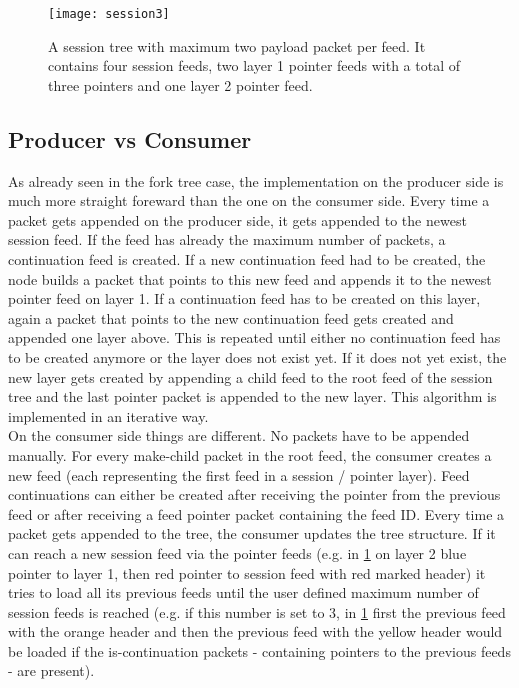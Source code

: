 \begin{figure}
\centering
\texttt{[image: session3]}
\caption{A session tree with maximum two payload packet per feed. It contains four session feeds, two layer 1 pointer feeds with a total of three pointers and one layer 2 pointer feed.}
\label{fig:session3}
\end{figure}



\subsection{Producer vs Consumer}
As already seen in the fork tree case, the implementation on the producer side is much more straight foreward than the one on the consumer side. Every time a packet gets appended on the producer side, it gets appended to the newest session feed. If the feed has already the maximum number of packets, a continuation feed is created. If a new continuation feed had to be created, the node builds a packet that points to this new feed and appends it to the newest pointer feed on layer 1. If a continuation feed has to be created on this layer, again a packet that points to the new continuation feed gets created and appended one layer above. This is repeated until either no continuation feed has to be created anymore or the layer does not exist yet. If it does not yet exist, the new layer gets created by appending a child feed to the root feed of the session tree and the last pointer packet is appended to the new layer. This algorithm is implemented in an iterative way. \\
On the consumer side things are different. No packets have to be appended manually. For every make-child packet in the root feed, the consumer creates a new feed (each representing the first feed in a session / pointer layer). Feed continuations can either be created after receiving the pointer from the previous feed or after receiving a feed pointer packet containing the feed ID. Every time a packet gets appended to the tree, the consumer updates the tree structure. If it can reach a new session feed via the pointer feeds (e.g. in \cref{fig:session3} on layer 2 blue pointer to layer 1, then red pointer to session feed with red marked header) it tries to load all its previous feeds until the user defined maximum number of session feeds is reached (e.g. if this number is set to 3, in \cref{fig:session3} first the previous feed with the orange header and then the previous feed with the yellow header would be loaded if the is-continuation packets - containing pointers to the previous feeds - are present). \\
